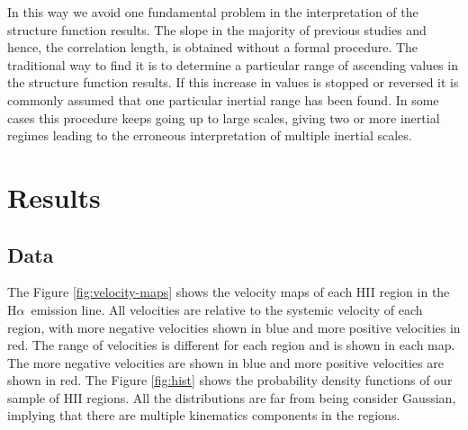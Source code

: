 \documentclass[fleqn,usenatbib, useAMS, a4paper]{mnras}
\newcommand\halpha{H${\alpha}$}
\begin{document}
In this way we avoid one fundamental problem in the interpretation of the structure function results. 
The slope in the majority of previous studies and hence, the correlation length, is obtained without a formal procedure. 
The traditional way to find it is to determine a particular range of ascending values in the structure function results. 
If this increase in values is stopped or reversed it is commonly assumed that one particular inertial range has been found. 
In some cases this procedure keeps going up to large scales, giving two or more inertial regimes leading to the erroneous interpretation of multiple inertial scales.


\section{Results}\label{sec:results}

\subsection{Data}

The Figure \ref{fig:velocity-maps} shows the velocity maps of each HII region in the \halpha\ emission line.
All velocities are relative to the systemic velocity of each region, with more negative velocities shown in blue and more positive velocities in red. The range of velocities is different for each region and is shown in each map. The more negative velocities are shown in blue and more positive velocities are shown in red.
The Figure \ref{fig:hist} shows the probability density functions of our sample of HII regions.
All the distributions are far from being consider Gaussian, implying that there are multiple kinematics components in the regions.
\end{document}
